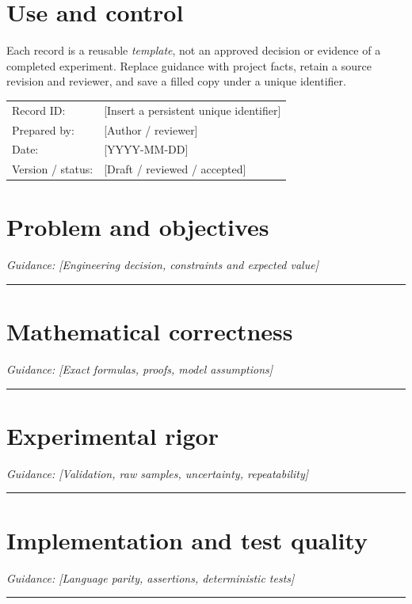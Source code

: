\documentclass[11pt]{article}
\begin{document}
\makedoctitle
\section{Use and control}
Each record is a reusable \emph{template}, not an approved decision or evidence of a completed experiment. Replace guidance with project facts, retain a source revision and reviewer, and save a filled copy under a unique identifier.\par\medskip
\begin{tabularx}{\linewidth}{@{}lX@{}}Record ID: & [Insert a persistent unique identifier] \\ Prepared by: & [Author / reviewer] \\ Date: & [YYYY-MM-DD] \\ Version / status: & [Draft / reviewed / accepted] \\\end{tabularx}
\section{Problem and objectives}
\noindent\textit{Guidance: [Engineering decision, constraints and expected value]}\par\vspace{0.9cm}\hrule\vspace{0.25cm}
\section{Mathematical correctness}
\noindent\textit{Guidance: [Exact formulas, proofs, model assumptions]}\par\vspace{0.9cm}\hrule\vspace{0.25cm}
\section{Experimental rigor}
\noindent\textit{Guidance: [Validation, raw samples, uncertainty, repeatability]}\par\vspace{0.9cm}\hrule\vspace{0.25cm}
\section{Implementation and test quality}
\noindent\textit{Guidance: [Language parity, assertions, deterministic tests]}\par\vspace{0.9cm}\hrule\vspace{0.25cm}
\end{document}
